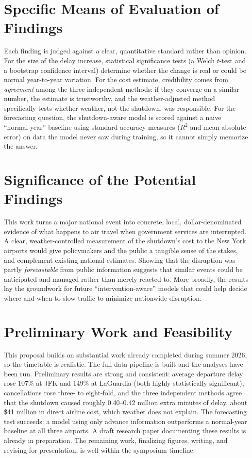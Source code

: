 \documentclass[11pt]{article}
\begin{document}
\section*{Specific Means of Evaluation of Findings}
Each finding is judged against a clear, quantitative standard rather than
opinion. For the size of the delay increase, statistical significance tests
(a Welch $t$-test and a bootstrap confidence interval) determine whether the
change is real or could be normal year-to-year variation. For the cost estimate,
credibility comes from \emph{agreement} among the three independent methods: if
they converge on a similar number, the estimate is trustworthy, and the
weather-adjusted method specifically tests whether weather, not the shutdown,
was responsible. For the forecasting question, the shutdown-aware model is scored
against a naive ``normal-year'' baseline using standard accuracy measures
($R^2$ and mean absolute error) on data the model never saw during training, so
it cannot simply memorize the answer.

\section*{Significance of the Potential Findings}
This work turns a major national event into concrete, local, dollar-denominated
evidence of what happens to air travel when government services are interrupted.
A clear, weather-controlled measurement of the shutdown's cost to the New York
airports would give policymakers and the public a tangible sense of the stakes,
and complement existing national estimates. Showing that the disruption was
partly \emph{forecastable} from public information suggests that similar events
could be anticipated and managed rather than merely reacted to. More broadly, the
results lay the groundwork for future ``intervention-aware'' models that could
help decide where and when to slow traffic to minimize nationwide disruption.

\section*{Preliminary Work and Feasibility}
This proposal builds on substantial work already completed during summer 2026,
so the timetable is realistic. The full data pipeline is built and the analyses
have been run. Preliminary results are strong and consistent: average departure
delay rose 107\% at JFK and 149\% at LaGuardia (both highly statistically
significant), cancellations rose three- to eight-fold, and the three independent
methods agree that the shutdown caused roughly 0.40--0.42 million extra minutes
of delay, about \$41 million in direct airline cost, which weather does not
explain. The forecasting test succeeds: a model using only advance information
outperforms a normal-year baseline at all three airports. A draft research paper
documenting these results is already in preparation. The remaining work,
finalizing figures, writing, and revising for presentation, is well within the
symposium timeline.
\end{document}
